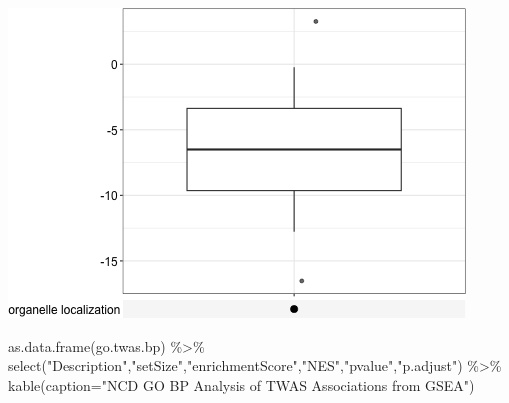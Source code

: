 \documentclass[
]{article}
\newenvironment{Shaded}{\begin{snugshade}}{\end{snugshade}}
\newcommand{\AttributeTok}[1]{\textcolor[rgb]{0.77,0.63,0.00}{#1}}
\newcommand{\FunctionTok}[1]{\textcolor[rgb]{0.00,0.00,0.00}{#1}}
\newcommand{\NormalTok}[1]{#1}
\newcommand{\SpecialCharTok}[1]{\textcolor[rgb]{0.00,0.00,0.00}{#1}}
\newcommand{\StringTok}[1]{\textcolor[rgb]{0.31,0.60,0.02}{#1}}
\begin{document}
\includegraphics{figures/twas-go-9.png}

\begin{Shaded}
\begin{Highlighting}[]
\FunctionTok{as.data.frame}\NormalTok{(go.twas.bp) }\SpecialCharTok{\%\textgreater{}\%} \FunctionTok{select}\NormalTok{(}\StringTok{"Description"}\NormalTok{,}\StringTok{"setSize"}\NormalTok{,}\StringTok{"enrichmentScore"}\NormalTok{,}\StringTok{"NES"}\NormalTok{,}\StringTok{"pvalue"}\NormalTok{,}\StringTok{"p.adjust"}\NormalTok{) }\SpecialCharTok{\%\textgreater{}\%}
  \FunctionTok{kable}\NormalTok{(}\AttributeTok{caption=}\StringTok{"NCD GO BP Analysis of TWAS Associations from GSEA"}\NormalTok{)}
\end{Highlighting}
\end{Shaded}
\end{document}

